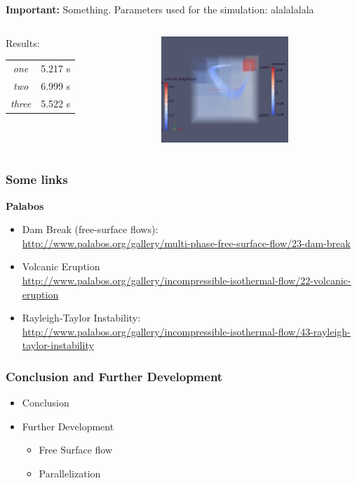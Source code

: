 \documentclass{beamer}
\begin{document}
\begin{frame}
\begin{alertblock}{{\bf Important: } Something.} 
Parameters used for the simulation: alalalalala
\end{alertblock}
\vspace{0.7cm}
\begin{columns}
\begin{column}{0.47\textwidth}
Results:
\vspace{0.4cm}
\begin{tabular}{|c||c|}\hline
\it one & 5.217 s \\
\it two & 6.999 s \\
\it three & 5.522 s \\
\hline
\end{tabular}

\end{column}
\begin{column}{0.5\textwidth}
\flushright
\includegraphics[height=4cm]{simpleCavity.png}
\end{column}
\end{columns}
\end{frame}


\begin{frame}
\frametitle{Some links}  %
{\Large \bf Palabos}\\
\begin{itemize}
\item Dam Break (free-surface flows): \\
\url{http://www.palabos.org/gallery/multi-phase-free-surface-flow/23-dam-break}
\item Volcanic Eruption \\
\url{http://www.palabos.org/gallery/incompressible-isothermal-flow/22-volcanic-eruption}
\item Rayleigh-Taylor Instability: \\
\url{http://www.palabos.org/gallery/incompressible-isothermal-flow/43-rayleigh-taylor-instability}
\end{itemize}
\end{frame}

\begin{frame}
\frametitle{Conclusion and Further Development}

\begin{itemize}
\item Conclusion
\item Further Development
\begin{itemize}
\item Free Surface flow
\item Parallelization
\end{itemize}
\end{itemize}
\end{frame}
\end{document}
